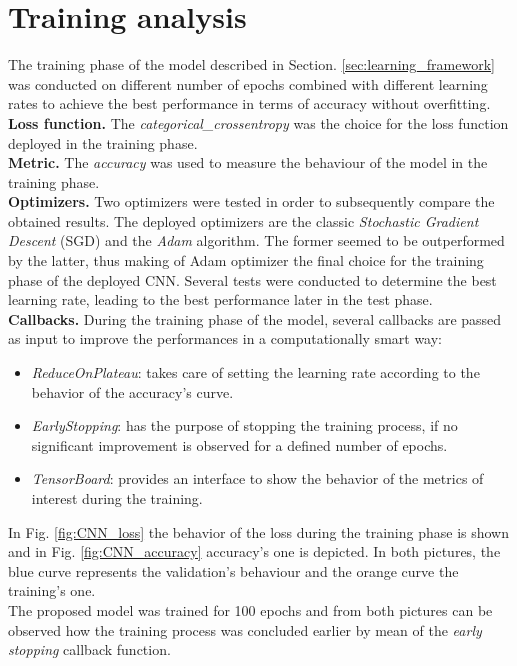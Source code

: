 \section{Training analysis}
\noindent The training phase of the model described in Section. \ref{sec:learning_framework} was conducted on different number of epochs combined with different learning rates to achieve the best performance in terms of accuracy without overfitting.\\

\noindent \textbf{Loss function.} The {\it{categorical\_crossentropy}} was the choice for the loss function deployed in the training phase.\\

\noindent \textbf{Metric.} The {\it{accuracy}} was used to measure the behaviour of the model in the training phase.\\

\noindent \textbf{Optimizers.} Two optimizers were tested in order to subsequently compare the obtained results. The deployed optimizers are the classic {\it{Stochastic Gradient Descent}} (SGD) and the {\it{Adam}} algorithm. The former seemed to be outperformed by the latter, thus making of Adam optimizer the final choice for the training phase of the deployed CNN. Several tests were conducted to determine the best learning rate, leading to the best performance later in the test phase. \\

\noindent \textbf{Callbacks.} During the training phase of the model, several callbacks are passed as input to improve the performances in a computationally smart way:
\begin{itemize}
\item {\it{ReduceOnPlateau}}: takes care of setting the learning rate according to the behavior of the accuracy's curve.
\item {\it{EarlyStopping}}: has the purpose of stopping the training process, if no significant improvement is observed for a defined number of epochs.
\item {\it{TensorBoard}}: provides an interface to show the behavior of the metrics of interest during the training.\\
\end{itemize}

\noindent In Fig. \ref{fig:CNN_loss} the behavior of the loss during the training phase is shown and in Fig.  \ref{fig:CNN_accuracy} accuracy's one is depicted. In both pictures, the blue curve represents the validation's behaviour and the orange curve the training's one.\\The proposed model was trained for 100 epochs and from both pictures can be observed how the training process was concluded earlier by mean of the {\it{early stopping}} callback function.

